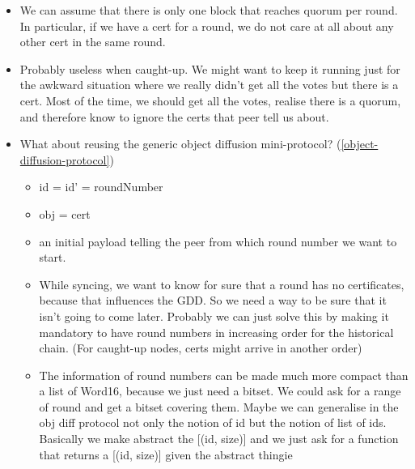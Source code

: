 \begin{itemize}
\item We can assume that there is only one block that reaches quorum per round.
  In particular, if we have a cert for a round, we do not care at all about any
  other cert in the same round.

\item Probably useless when caught-up. We might want to keep it running just for
  the awkward situation where we really didn’t get all the votes but there is a
  cert. Most of the time, we should get all the votes, realise there is a
  quorum, and therefore know to ignore the certs that peer tell us about.

\item What about reusing the generic object diffusion mini-protocol?
  (\autoref{object-diffusion-protocol})
  \begin{itemize}
  \item id = id’ = roundNumber

  \item obj = cert

  \item an initial payload telling the peer from which round number we want to
    start.

  \item While syncing, we want to know for sure that a round has no
    certificates, because that influences the GDD. So we need a way to be sure
    that it isn’t going to come later. Probably we can just solve this by making
    it mandatory to have round numbers in increasing order for the historical
    chain. (For caught-up nodes, certs might arrive in another order)

  \item The information of round numbers can be made much more compact than a
    list of Word16, because we just need a bitset. We could ask for a range of
    round and get a bitset covering them. Maybe we can generalise in the obj
    diff protocol not only the notion of id but the notion of list of ids.
    Basically we make abstract the [(id, size)] and we just ask for a function
    that returns a [(id, size)] given the abstract thingie
  \end{itemize}
\end{itemize}
